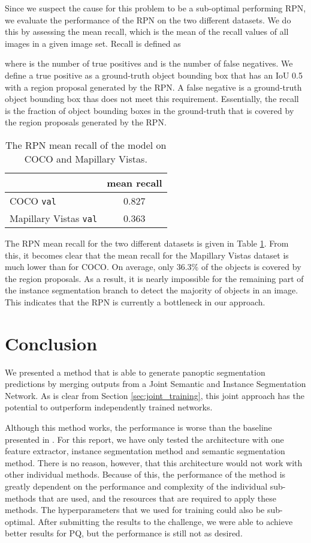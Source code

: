 \documentclass[10pt,twocolumn,letterpaper]{article}
\begin{document}
Since we suspect the cause for this problem to be a sub-optimal performing RPN, we evaluate the performance of the RPN on the two different datasets. We do this by assessing the mean recall, which is the mean of the recall values of all images in a given image set. Recall is defined as



where  is the number of true positives and  is the number of false negatives. We define a true positive as a ground-truth object bounding box that has an IoU  0.5 with a region proposal generated by the RPN. A false negative is a ground-truth object bounding box thas does not meet this requirement. Essentially, the recall is the fraction of object bounding boxes in the ground-truth that is covered by the region proposals generated by the RPN. 

\begin{table}[ht]
\centering
\begin{tabular}{ l | c }
& mean recall \\ \hline
COCO \texttt{val} & 0.827 \\
Mapillary Vistas \texttt{val} & 0.363 \\
\end{tabular}
\caption{The RPN mean recall of the model on COCO and Mapillary Vistas.}
\label{tab:recall}
\end{table}

The RPN mean recall for the two different datasets is given in Table \ref{tab:recall}. From this, it becomes clear that the mean recall for the Mapillary Vistas dataset is much lower than for COCO. On average, only 36.3\% of the objects is covered by the region proposals. As a result, it is nearly impossible for the remaining part of the instance segmentation branch to detect the majority of objects in an image. This indicates that the RPN is currently a bottleneck in our approach.




\section{Conclusion}
We presented a method that is able to generate panoptic segmentation predictions by merging outputs from a Joint Semantic and Instance Segmentation Network. As is clear from Section \ref{sec:joint_training}, this joint approach has the potential to outperform independently trained networks.

Although this method works, the performance is worse than the baseline presented in \cite{Kirillov2018}. For this report, we have only tested the architecture with one feature extractor, instance segmentation method and semantic segmentation method. There is no reason, however, that this architecture would not work with other individual methods. Because of this, the performance of the method is greatly dependent on the performance and complexity of the individual sub-methods that are used, and the resources that are required to apply these methods. The hyperparameters that we used for training could also be sub-optimal. After submitting the results to the challenge, we were able to achieve better results for PQ, but the performance is still not as desired.
\end{document}
